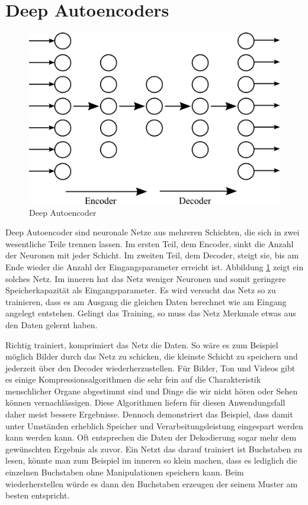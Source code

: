 \section{Deep Autoencoders}

\begin{figure}
	\centering
	\includegraphics[scale=1]{images/autoencoder.png}
	\caption{Deep Autoencoder}
	\label{fig:autoencoder}
\end{figure}

Deep Autoencoder sind neuronale Netze aus mehreren Schichten, die sich in zwei wesentliche Teile trennen lassen. Im ersten Teil, dem Encoder, sinkt die Anzahl der Neuronen mit jeder Schicht. Im zweiten Teil, dem Decoder, steigt sie, bis am Ende wieder die Anzahl der Eingangsparameter erreicht ist. Abbildung \ref{fig:autoencoder} zeigt ein solches Netz. Im inneren hat das Netz weniger Neuronen und somit geringere Speicherkapazität als Eingangsparameter. Es wird versucht das Netz so zu trainieren, dass es am Ausgang die gleichen Daten berechnet wie am Eingang angelegt entstehen. Gelingt das Training, so muss das Netz Merkmale etwas aus den Daten gelernt haben.

Richtig trainiert, komprimiert das Netz die Daten. So wäre es zum Beispiel möglich Bilder durch das Netz zu schicken, die kleinste Schicht zu speichern und jederzeit über den Decoder wiederherzustellen. Für Bilder, Ton und Videos gibt es einige Kompressionsalgorithmen die sehr fein auf die Charakteristik menschlicher Organe abgestimmt sind und Dinge die wir nicht hören oder Sehen können vernachlässigen. Diese Algorithmen liefern für diesen Anwendungsfall daher meist bessere Ergebnisse. Dennoch demonstriert das Beispiel, dass damit unter Umständen erheblich Speicher und Verarbeitungsleistung eingespart werden kann werden kann. Oft entsprechen die Daten der Dekodierung sogar mehr dem gewünschten Ergebnis als zuvor. Ein Netzt das darauf trainiert ist Buchstaben zu lesen, könnte man zum Beispiel im inneren so klein machen, dass es lediglich die einzelnen Buchstaben ohne Manipulationen speichern kann. Beim wiederherstellen würde es dann den Buchstaben erzeugen der seinem Muster am besten entspricht.

